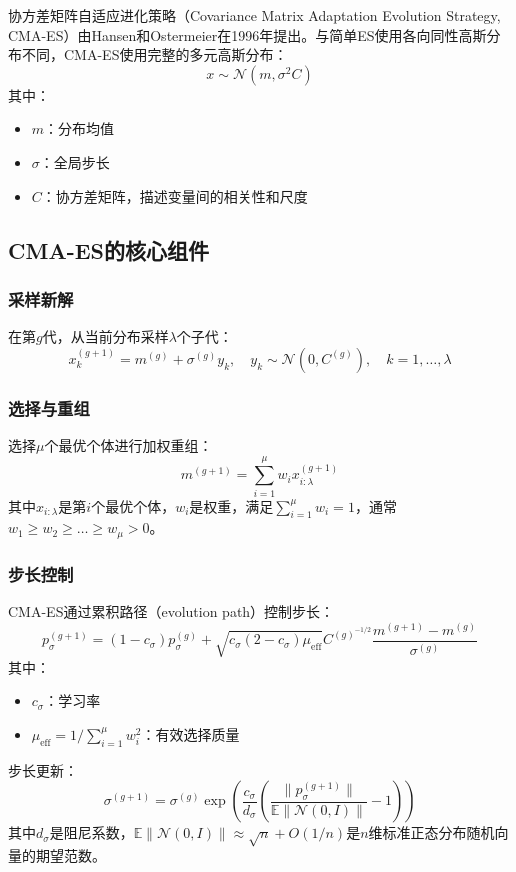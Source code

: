 协方差矩阵自适应进化策略（Covariance Matrix Adaptation Evolution Strategy, CMA-ES）由Hansen和Ostermeier在1996年提出。与简单ES使用各向同性高斯分布不同，CMA-ES使用完整的多元高斯分布：
\[
x \sim \mathcal{N}(m, \sigma^2 C)
\]
其中：
\begin{itemize}
    \item $m$：分布均值
    \item $\sigma$：全局步长
    \item $C$：协方差矩阵，描述变量间的相关性和尺度
\end{itemize}

\subsection{CMA-ES的核心组件}

\subsubsection{采样新解}

在第$g$代，从当前分布采样$\lambda$个子代：
\[
x_k^{(g+1)} = m^{(g)} + \sigma^{(g)} y_k, \quad y_k \sim \mathcal{N}(0, C^{(g)}), \quad k=1,\dots,\lambda
\]

\subsubsection{选择与重组}

选择$\mu$个最优个体进行加权重组：
\[
m^{(g+1)} = \sum_{i=1}^{\mu} w_i x_{i:\lambda}^{(g+1)}
\]
其中$x_{i:\lambda}$是第$i$个最优个体，$w_i$是权重，满足$\sum_{i=1}^{\mu} w_i = 1$，通常$w_1 \geq w_2 \geq \dots \geq w_\mu > 0$。

\subsubsection{步长控制}

CMA-ES通过累积路径（evolution path）控制步长：
\[
p_\sigma^{(g+1)} = (1 - c_\sigma) p_\sigma^{(g)} + \sqrt{c_\sigma(2 - c_\sigma)\mu_{\text{eff}}} C^{(g)^{-1/2}} \frac{m^{(g+1)} - m^{(g)}}{\sigma^{(g)}}
\]
其中：
\begin{itemize}
    \item $c_\sigma$：学习率
    \item $\mu_{\text{eff}} = 1/\sum_{i=1}^{\mu} w_i^2$：有效选择质量
\end{itemize}

步长更新：
\[
\sigma^{(g+1)} = \sigma^{(g)} \exp\left(\frac{c_\sigma}{d_\sigma} \left(\frac{\|p_\sigma^{(g+1)}\|}{\mathbb{E}\|\mathcal{N}(0,I)\|} - 1\right)\right)
\]
其中$d_\sigma$是阻尼系数，$\mathbb{E}\|\mathcal{N}(0,I)\| \approx \sqrt{n} + O(1/n)$是$n$维标准正态分布随机向量的期望范数。

